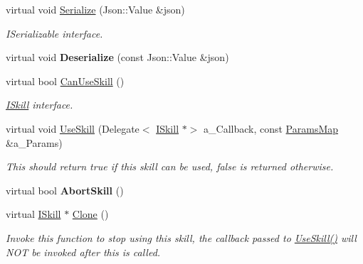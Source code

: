 \begin{DoxyCompactItemize}
\mbox{\label{class_gesture_skill_a9a0b5dcba0cbbced2bfc5108304d7513}} 
virtual void \hyperlink{class_gesture_skill_a9a0b5dcba0cbbced2bfc5108304d7513}{Serialize} (Json\+::\+Value \&json)
\begin{DoxyCompactList}\small\item\em I\+Serializable interface. \end{DoxyCompactList}\item 
\mbox{\label{class_gesture_skill_a16b99eb71c3757981012b70979cd5b85}} 
virtual void {\bfseries Deserialize} (const Json\+::\+Value \&json)
\item 
\mbox{\label{class_gesture_skill_a44a7d102f239e72a1199c122f33d19ba}} 
virtual bool \hyperlink{class_gesture_skill_a44a7d102f239e72a1199c122f33d19ba}{Can\+Use\+Skill} ()
\begin{DoxyCompactList}\small\item\em \hyperlink{class_i_skill}{I\+Skill} interface. \end{DoxyCompactList}\item 
\mbox{\label{class_gesture_skill_a2cecea782e270b8e7fe86189f839c1e7}} 
virtual void \hyperlink{class_gesture_skill_a2cecea782e270b8e7fe86189f839c1e7}{Use\+Skill} (Delegate$<$ \hyperlink{class_i_skill}{I\+Skill} $\ast$$>$ a\+\_\+\+Callback, const \hyperlink{class_params_map}{Params\+Map} \&a\+\_\+\+Params)
\begin{DoxyCompactList}\small\item\em This should return true if this skill can be used, false is returned otherwise. \end{DoxyCompactList}\item 
\mbox{\label{class_gesture_skill_a20d5b15e86591d642c89c492bf29b66e}} 
virtual bool {\bfseries Abort\+Skill} ()
\item 
\mbox{\label{class_gesture_skill_ac903e6f48157179e362f680e99274dcc}} 
virtual \hyperlink{class_i_skill}{I\+Skill} $\ast$ \hyperlink{class_gesture_skill_ac903e6f48157179e362f680e99274dcc}{Clone} ()
\begin{DoxyCompactList}\small\item\em Invoke this function to stop using this skill, the callback passed to \hyperlink{class_gesture_skill_a2cecea782e270b8e7fe86189f839c1e7}{Use\+Skill()} will N\+OT be invoked after this is called. \end{DoxyCompactList}\end{DoxyCompactItemize}
